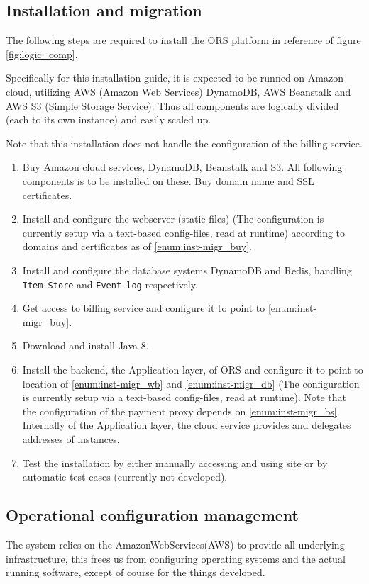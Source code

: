 \subsection{Installation and migration}
\label{sec:inst-migr}
The following steps are required to install the ORS platform in reference of figure \ref{fig:logic_comp}.

Specifically for this installation guide, it is expected to be runned on Amazon cloud, utilizing AWS (Amazon Web Services) DynamoDB, AWS Beanstalk and AWS S3 (Simple Storage Service). Thus all components are logically divided (each to its own instance) and easily scaled up.

Note that this installation does not handle the configuration of the billing service.
\begin{enumerate}
    \item \label{enum:inst-migr_buy} Buy Amazon cloud services, DynamoDB,
    Beanstalk and S3. All following components is to be installed on these. Buy domain name and SSL certificates.
    \item \label{enum:inst-migr_wb} Install and configure the webserver (static files) (The configuration is currently setup via a text-based config-files, read at runtime) according to domains and certificates as of \ref{enum:inst-migr_buy}.
    \item \label{enum:inst-migr_db} Install and configure the database systems DynamoDB and Redis, handling \texttt{Item Store} and \texttt{Event log} respectively.
    \item \label{enum:inst-migr_bs} Get access to billing service and configure it to point to \ref{enum:inst-migr_buy}.
    \item Download and install Java 8.
    \item Install the backend, the Application layer, of ORS and configure it to point to location of \ref{enum:inst-migr_wb} and \ref{enum:inst-migr_db} (The configuration is currently setup via a text-based config-files, read at runtime). Note that the configuration of the payment proxy depends on \ref{enum:inst-migr_bs}. Internally of the Application layer, the cloud service provides and delegates addresses of instances.
    \item Test the installation by either manually accessing and using site or by automatic test cases (currently not developed).
\end{enumerate}

\subsection{Operational configuration management}
\label{sec:oper-conf-manag}
The system relies on the AmazonWebServices(AWS) to provide all underlying
infrastructure, this frees us from configuring operating systems and the actual
running software, except of course for the things developed.

